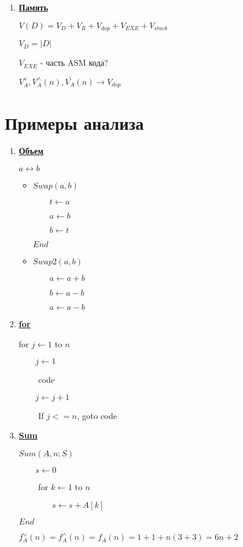 \documentclass[12pt]{report}
\begin{document}
\begin{enumerate}
		\item\underline{\textbf{Память}}\par
		$V(D) = V_{D} + V_{R} + V_{dop} + V_{EXE} + V_{stack}$\par
		$V_{D} = |D|$\par
		$V_{EXE}$ - часть ASM кода?\par
		$V_{A}^{\vee}, V_{A}^{\wedge}(n), \bar{V_{A}}(n) \rightarrow V_{dop}$\par
	\end{enumerate}

	\section*{Примеры анализа}
	\begin{enumerate}
		\item\underline{\textbf{Объем}}\par
		$a \leftrightarrow b$\par
		\begin{itemize}
			\item $Swap(a, b)$\par
			$\qquad t \leftarrow a$\par
			$\qquad a \leftarrow b$\par
			$\qquad b \leftarrow t$\par
			$End$\par
			
			\item $Swap2(a,b)$\par
			$\qquad a \leftarrow a + b$\par
			$\qquad b \leftarrow a - b$\par
			$\qquad a \leftarrow a - b$\par
		\end{itemize}
		
		\item\underline{\textbf{for}}\par
		for $j \leftarrow 1$ to $n$\par
		$\qquad j \leftarrow 1$\par
		$\qquad$ code\par
		$\qquad j \leftarrow j + 1$\par
		$\qquad$ If $j <= n$, goto code\par
		
		\item\underline{\textbf{Sum}}\par
		$Sum(A, n; S)$\par
		$\qquad s \leftarrow 0$\par
		$\qquad$ for $k \leftarrow 1$ to $n$\par
		$\qquad\qquad s \leftarrow s + A[k]$\par
		$End$\par
		$f_{A}^{\vee}(n)=f_{A}^{\wedge}(n) = f_{A}(n) = 1 + 1 + n(3 + 3) = 6n + 2$
		

\end{enumerate}
\end{document}
